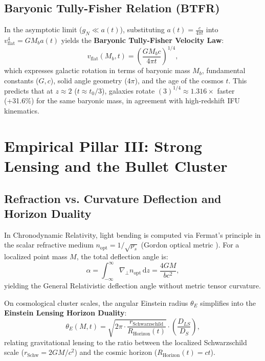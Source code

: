 \documentclass[aps,prd,reprint,superscriptaddress,nofootinbib,floatfix,amsmath,amssymb]{revtex4-2}
\begin{document}
\subsection{Baryonic Tully-Fisher Relation (BTFR)}

In the asymptotic limit ($g_N \ll a(t)$), substituting $a(t) = \frac{c}{4\pi t}$ into $v_{\text{flat}}^4 = G M_b a(t)$ yields the \textbf{Baryonic Tully-Fisher Velocity Law}:
\begin{equation}
v_{\text{flat}}(M_b, t) = \left( \frac{G M_b c}{4\pi t} \right)^{1/4},
\label{eq:btfr_t}
\end{equation}
which expresses galactic rotation in terms of baryonic mass $M_b$, fundamental constants ($G, c$), solid angle geometry ($4\pi$), and the age of the cosmos $t$. This predicts that at $z \approx 2$ ($t \approx t_0/3$), galaxies rotate $(3)^{1/4} \approx 1.316\times$ faster (+31.6\%) for the same baryonic mass, in agreement with high-redshift IFU kinematics.

\section{Empirical Pillar III: Strong Lensing and the Bullet Cluster}
\label{sec:lensing}

\subsection{Refraction vs. Curvature Deflection and Horizon Duality}

In Chronodynamic Relativity, light bending is computed via Fermat's principle in the scalar refractive medium $n_{\text{opt}} = 1/\sqrt{\rho_s}$ (Gordon optical metric \cite{Gordon1923}). For a localized point mass $M$, the total deflection angle is:
\begin{equation}
\alpha = \int_{-\infty}^{\infty} \nabla_\perp n_{\text{opt}} \, \mathrm{d}z = \frac{4 G M}{b c^2},
\label{eq:lensing_angle}
\end{equation}
yielding the General Relativistic deflection angle without metric tensor curvature.

On cosmological cluster scales, the angular Einstein radius $\theta_E$ simplifies into the \textbf{Einstein Lensing Horizon Duality}:
\begin{equation}
\theta_E(M, t) = \sqrt{2\pi \cdot \frac{r_{\text{Schwarzschild}}}{R_{\text{Horizon}}(t)}} \cdot \left(\frac{D_{LS}}{D_S}\right),
\label{eq:einstein_duality}
\end{equation}
relating gravitational lensing to the ratio between the localized Schwarzschild scale ($r_{\text{Schw}} = 2GM/c^2$) and the cosmic horizon ($R_{\text{Horizon}}(t) = c t$).
\end{document}
